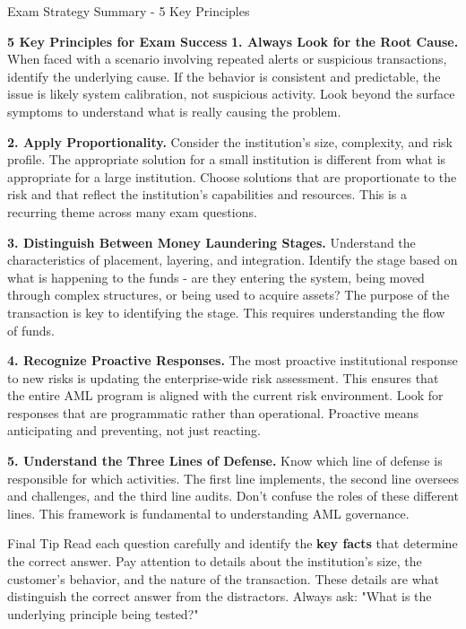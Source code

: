 \documentclass[5pt]{beamer}
\begin{document}
	\begin{frame}{Exam Strategy Summary - 5 Key Principles}
		\begin{block}{\tiny \textbf{5 Key Principles for Exam Success}}
			\tiny \textbf{1. Always Look for the Root Cause.} When faced with a scenario involving repeated alerts or suspicious transactions, identify the underlying cause. If the behavior is consistent and predictable, the issue is likely system calibration, not suspicious activity. Look beyond the surface symptoms to understand what is really causing the problem.
			
			\textbf{2. Apply Proportionality.} Consider the institution's size, complexity, and risk profile. The appropriate solution for a small institution is different from what is appropriate for a large institution. Choose solutions that are proportionate to the risk and that reflect the institution's capabilities and resources. This is a recurring theme across many exam questions.
			
			\textbf{3. Distinguish Between Money Laundering Stages.} Understand the characteristics of placement, layering, and integration. Identify the stage based on what is happening to the funds - are they entering the system, being moved through complex structures, or being used to acquire assets? The purpose of the transaction is key to identifying the stage. This requires understanding the flow of funds.
			
			\textbf{4. Recognize Proactive Responses.} The most proactive institutional response to new risks is updating the enterprise-wide risk assessment. This ensures that the entire AML program is aligned with the current risk environment. Look for responses that are programmatic rather than operational. Proactive means anticipating and preventing, not just reacting.
			
			\textbf{5. Understand the Three Lines of Defense.} Know which line of defense is responsible for which activities. The first line implements, the second line oversees and challenges, and the third line audits. Don't confuse the roles of these different lines. This framework is fundamental to understanding AML governance.
		\end{block}
		
		\begin{alertblock}{Final Tip}
			\tiny Read each question carefully and identify the \textbf{key facts} that determine the correct answer. Pay attention to details about the institution's size, the customer's behavior, and the nature of the transaction. These details are what distinguish the correct answer from the distractors. Always ask: "What is the underlying principle being tested?"
		\end{alertblock}
	\end{frame}
	
\end{document}
